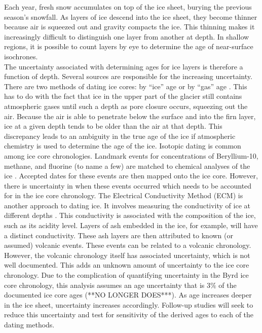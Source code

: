 \documentclass[jgrga]{agutex}
\begin{document}
\begin{article}
	Each year, fresh snow accumulates on top of the ice sheet, burying the previous season’s snowfall. As layers of ice descend into the ice sheet, they become thinner because air is squeezed out and gravity compacts the ice. This thinning makes it increasingly difficult to distinguish one layer from another at depth. In shallow regions, it is possible to count layers by eye to determine the age of near-surface isochrones.\\
	The uncertainty associated with determining ages for ice layers is therefore a function of depth. Several sources are responsible for the increasing uncertainty. There are two methods of dating ice cores: by “ice” age or by “gas” age \citep{bender2006}. This has to do with the fact that ice in the upper part of the glacier still contains atmospheric gases until such a depth as pore closure occurs, squeezing out the air. Because the air is able to penetrate below the surface and into the firn layer, ice at a given depth tends to be older than the air at that depth. This discrepancy leads to an ambiguity in the true age of the ice if atmospheric chemistry is used to determine the age of the ice. Isotopic dating is common among ice core chronologies. Landmark events for concentrations of Beryllium-10, methane, and fluorine (to name a few) are matched to chemical analyses of the ice \citep[e.g.]{schwander2001}. Accepted dates for these events are then mapped onto the ice core. However, there is uncertainty in when these events occurred which needs to be accounted for in the ice core chronology.
	The Electrical Conductivity Method (ECM) is another approach to dating ice. It involves measuring the conductivity of ice at different depths \citep{hammer1994}. This conductivity is associated with the composition of the ice, such as its acidity level. Layers of ash embedded in the ice, for example, will have a distinct conductivity. These ash layers are then attributed to known (or assumed) volcanic events. These events can be related to a volcanic chronology.  However, the volcanic chronology itself has associated uncertainty, which is not well documented. This adds an unknown amount of uncertainty to the ice core chronology.
	Due to the complication of quantifying uncertainty in the Byrd ice core chronology, this analysis assumes an age uncertainty that is 3$\%$ of the documented ice core ages (**NO LONGER DOES***). As age increases deeper in the ice sheet, uncertainty increases accordingly. Follow-up studies will seek to reduce this uncertainty and test for sensitivity of the derived ages to each of the dating methods.






\end{article}
\end{document}
